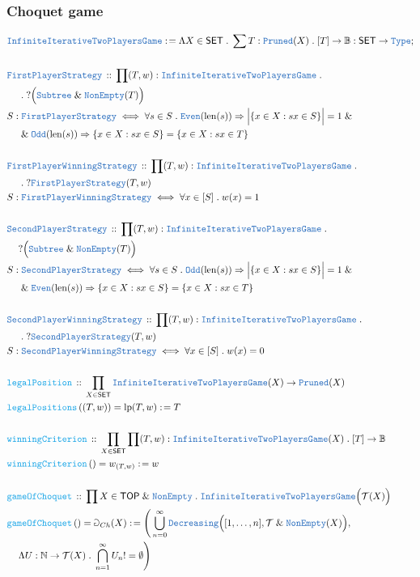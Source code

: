 \documentclass[12pt]{scrartcl}
\newcommand{\TYPE}[1]{\textcolor{NavyBlue}{\mathtt{#1}}}
\newcommand{\FUNC}[1]{\textcolor{Cerulean}{\mathtt{#1}}}
\renewcommand{\.}{\; . \;}
\newcommand{\de}{: \kern 0.1pc =}
\newcommand{\Act}[1]{\left( #1 \right)}
\newcommand{\DeclareType}[2]{& \TYPE{#1} \, :: \, #2 \\}
\newcommand{\DefineType}[3]{& #1 : \TYPE{#2} \iff #3 \\}
\newcommand{\DeclareFunc}[2]{& \FUNC{#1} \, :: \, #2 \\}
\newcommand{\DefineNamedFunc}[4]{&  \FUNC{#1}\Act{#2} = #3 \de #4 \\}
\newcommand{\NewLine}{\\ & \kern 1pc}
\newcommand{\Page}[1]{ \begin{align*} #1 \end{align*}   }
\renewcommand{\And}{\; \& \;}
\newcommand{\Imply}{\Rightarrow}
\newcommand{\Type}{\TYPE{Type}}
\newcommand{\Nat}{\mathbb{N} }
\newcommand{\Conclude}[3]{& #1 \de #2 : #3; \\}
\newcommand{\SET}{\mathsf{SET}}
\newcommand{\TOP}{\mathsf{TOP}}
\newcommand{\T}{\mathcal{T}}
\newcommand{\Bool}{\mathbb{B}}
\newcommand{\IIPG}{\TYPE{InfiniteIterativeTwoPlayersGame}}
\newcommand{\FPS}{\TYPE{FirstPlayerStrategy}}
\newcommand{\SPS}{\TYPE{SecondPlayerStrategy}}
\newcommand{\FPWS}{\TYPE{FirstPlayerWinningStrategy}}
\newcommand{\SPWS}{\TYPE{SecondPlayerWinningStrategy}}
\DeclareMathOperator{\len}{len}
\DeclareMathOperator{\lp}{lp}
\begin{document}
\subsubsection{Choquet game}
\Page{
	\Conclude{\IIPG}{\Lambda X \in \SET \. \sum T : \TYPE{Pruned}(X) \. [T] \to \Bool }{\SET \to \Type}
	\\
	\DeclareType{\FPS}{\prod (T,w) : \IIPG \. \NewLine \. ?\Big(\TYPE{Subtree} \And \TYPE{NonEmpty}(T)\Big)}
	\DefineType{S}{\FPS}{
		\forall s \in S \.
		\TYPE{Even}(\len(s)) \Imply
		\Big|\{ x \in X :  sx \in S \}\Big| = 1
		\And \NewLine \And
		\TYPE{Odd}(\len(s)) \Imply
		\{ x \in X :  sx \in S \} = \{ x \in X : sx \in T \}
	}
	\\
	\DeclareType{\FPWS}{\prod (T,w) : \IIPG \. \NewLine \.  ?\FPS(T,w)}
	\DefineType{S}{\FPWS}{ \forall x \in [S] \. w(x) = 1}
	\\
	\DeclareType{\SPS}{\prod (T,w) : \IIPG \. \NewLine ?\Big(\TYPE{Subtree} \And \TYPE{NonEmpty}(T)\Big)}
	\DefineType{S}{\SPS}{
		\forall s \in S \.
		\TYPE{Odd}(\len(s)) \Imply
		\Big|\{ x \in X :  sx \in S \}\Big| = 1
		\And \NewLine \And
		\TYPE{Even}(\len(s)) \Imply
		\{ x \in X :  sx \in S \} = \{ x \in X : sx \in T \}
	}
	\\
	\DeclareType{\SPWS}{\prod (T,w) : \IIPG \. \NewLine \. ?\SPS(T,w)}
	\DefineType{S}{\SPWS}{ \forall x \in [S] \. w(x) = 0}
	\\
	\DeclareFunc{legalPosition}{\prod_{X \in \SET} \IIPG(X) \to \TYPE{Pruned}(X)}
	\DefineNamedFunc{legalPositions}{(T,w)}{\lp(T,w)}{T}
	\\
	\DeclareFunc{winningCriterion}{\prod_{X \in \SET} \prod (T,w) : \IIPG(X) \. [T] \to \Bool}
	\DefineNamedFunc{winningCriterion}{}{w_{(T,w)}}{w}
	\\
	\DeclareFunc{gameOfChoquet}{\prod X \in \TOP \And \TYPE{NonEmpty} \.  \IIPG\Big(\T(X)\Big)}
	\DefineNamedFunc{gameOfChoquet}{}{\Game_{Ch}(X)}
	{
		\Bigg(
			\bigcup_{n=0}^\infty \TYPE{Decreasing}\Big([1,\ldots,n],\T \And \TYPE{NonEmpty}(X) \Big),
		\NewLine
		\Lambda U : \Nat \to \T(X) \. \bigcap^\infty_{n=1} U_n != \emptyset
		\Bigg)
	}
}
\end{document}

